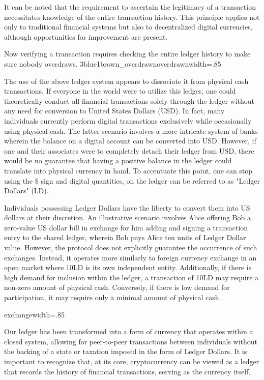 It can be noted that the requirement to ascertain the legitimacy of a transaction necessitates knowledge of the entire transaction history.
This principle applies not only to traditional financial systems but also to decentralized digital currencies, although opportunities for
improvement are present.

{Now verifying a transaction requires checking the entire ledger history to make sure nobody overdraws.}
{3blue1brown_overdrawn}{overdrawn}{width=.85\textwidth}%

The use of the above ledger system appears to dissociate it from physical cash transactions. If everyone in the world were to utilize this
ledger, one could theoretically conduct all financial transactions solely through the ledger without any need for conversion to United States
Dollars (USD). In fact, many individuals currently perform digital transactions exclusively while occasionally using physical cash. The
latter scenario involves a more intricate system of banks wherein the balance on a digital account can be converted into USD. However, if
one and their associates were to completely detach their ledger from USD, there would be no guarantee that having a positive balance in the
ledger could translate into physical currency in hand. To accentuate this point, one can stop using the \$ sign and digital quantities, on
the ledger can be referred to as "Ledger Dollars" (LD).

Individuals possessing Ledger Dollars have the liberty to convert them into US dollars at their discretion. An illustrative scenario involves
Alice offering Bob a zero-value US dollar bill in exchange for him adding and signing a transaction entry to the shared ledger, wherein Bob
pays Alice ten units of Ledger Dollar value. However, the protocol does not explicitly guarantee the occurrence of such exchanges. Instead,
it operates more similarly to foreign currency exchange in an open market where 10LD is its own independent entity. Additionally, if there
is high demand for inclusion within the ledger, a transaction of 10LD may require a non-zero amount of physical cash. Conversely, if there
is low demand for participation, it may require only a minimal amount of physical cash.

{exchange}{width=.85\textwidth}%

Our ledger has been transformed into a form of currency that operates within a closed system, allowing for peer-to-peer transactions between
individuals without the backing of a state or taxation imposed in the form of Ledger Dollars. It is important to recognize that, at its core,
cryptocurrency can be viewed as a ledger that records the history of financial transactions, serving as the currency itself.

